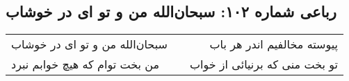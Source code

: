 \begin{center}
\section*{رباعی شماره ۱۰۲: سبحان‌الله من و تو ای در خوشاب}
\label{sec:0102}
\begin{longtable}{l p{0.5cm} r}
سبحان‌الله من و تو ای در خوشاب
&&
پیوسته مخالفیم اندر هر باب
\\
من بخت توام که هیچ خوابم نبرد
&&
تو بخت منی که برنیائی از خواب
\\
\end{longtable}
\end{center}
